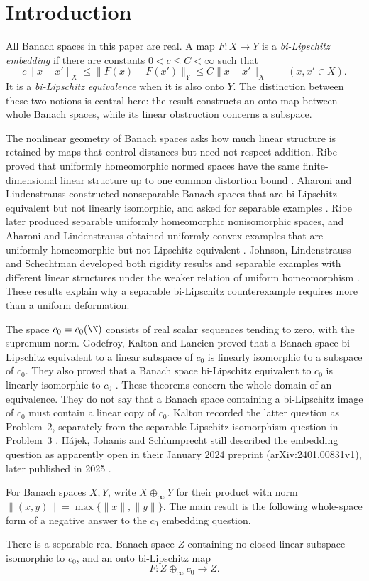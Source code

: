 \section{Introduction}\label{sec:introduction}

All Banach spaces in this paper are real. A map \(F:X\to Y\) is a
\emph{bi-Lipschitz embedding} if there are constants
\(0<c\leq C<\infty\) such that
\[
 c\|x-x'\|_X\leq\|F(x)-F(x')\|_Y
       \leq C\|x-x'\|_X\qquad(x,x'\in X).
\]
It is a \emph{bi-Lipschitz equivalence} when it is also onto \(Y\).
The distinction between these two notions is central here: the result
constructs an onto map between whole Banach spaces, while its linear
obstruction concerns a subspace.

The nonlinear geometry of Banach spaces asks how much linear structure
is retained by maps that control distances but need not respect
addition. Ribe proved that uniformly homeomorphic normed spaces have
the same finite-dimensional linear structure up to one common
distortion bound \cite[Theorem~1]{Ribe76}. Aharoni and Lindenstrauss
constructed nonseparable Banach spaces that are bi-Lipschitz equivalent
but not linearly isomorphic, and asked for separable examples
\cite[pp.~281--282]{AL78}. Ribe later produced separable uniformly
homeomorphic nonisomorphic spaces, and Aharoni and Lindenstrauss
obtained uniformly convex examples that are uniformly homeomorphic
but not Lipschitz equivalent \cite{Ribe84,AL85}.
Johnson, Lindenstrauss and Schechtman
developed both rigidity results and separable examples with different
linear structures under the weaker relation of uniform homeomorphism
\cite[Theorem~5.8 and Section~8(3)]{JLS96}. These results explain why a separable bi-Lipschitz
counterexample requires more than a uniform deformation.

The space \(c_0=c_0(\N)\) consists of real scalar sequences tending to
zero, with the supremum norm. Godefroy, Kalton and Lancien proved that a
Banach space bi-Lipschitz equivalent to a linear subspace of \(c_0\) is
linearly isomorphic to a subspace of \(c_0\). They also proved that a
Banach space bi-Lipschitz equivalent to \(c_0\) is linearly isomorphic
to \(c_0\) \cite[Theorems~2.1--2.2]{GKL00}. These theorems concern the
whole domain of an equivalence. They do not say that a Banach space
containing a bi-Lipschitz image of \(c_0\) must contain a linear copy
of \(c_0\). Kalton recorded the latter question as Problem~2, separately
from the separable Lipschitz-isomorphism question in Problem~3
\cite[pp.~21--22]{Kalton08}. H\'ajek, Johanis and Schlumprecht still described the
embedding question as apparently open in their January 2024 preprint
(arXiv:2401.00831v1), later published in 2025 \cite{HJS25}.

For Banach spaces \(X,Y\), write \(X\oplus_\infty Y\) for their product
with norm \(\|(x,y)\|=\max\{\|x\|,\|y\|\}\). The main result is the
following whole-space form of a negative answer to the \(c_0\)
embedding question.

\begin{theorem}\label{thm:main}
There is a separable real Banach space \(Z\) containing no closed linear
subspace isomorphic to \(c_0\), and an onto bi-Lipschitz map
\[
                 F:Z\oplus_\infty c_0\longrightarrow Z.
\]
\end{theorem}
